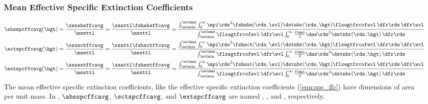 \documentclass[12pt]{article}
\begin{document}
\subsubsection[Mean Effective Specific Extinction Coefficients]{Mean Effective Specific Extinction Coefficients}\label{sxn:mac_ffc_avg}
\begin{subequations}
\label{eqn:spc_ffc_avg}
\begin{align}
\label{eqn:abs_spc_ffc_avg}
\absspcffcavg(\hgt) & = \frac{\xsxabsffcavg}{\mssttl} = 
\frac{\xsattl \fshabsffcavg}{\mssttl} =
\frac{\int_{\wvlmin}^{\wvlmax} \int_{0}^{\infty}
\mpi \rds^{2} \fshabs(\rds,\wvl) \dstnbr(\rds,\hgt) \flxwgtfrcofwvl \,\dfr\rds \,\dfr\wvl}
{\int_{\wvlmin}^{\wvlmax} \flxwgtfrcofwvl \,\dfr\wvl \int_{0}^{\infty}
\frac{4\mpi}{3} \dns \rds^{3} \dstnbr(\rds,\hgt) \,\dfr\rds} \\
\label{eqn:sct_spc_ffc_avg}
\sctspcffcavg(\hgt) & = \frac{\xsxsctffcavg}{\mssttl} = 
\frac{\xsattl \fshsctffcavg}{\mssttl} =
\frac{\int_{\wvlmin}^{\wvlmax} \int_{0}^{\infty}
\mpi \rds^{2} \fshsct(\rds,\wvl) \dstnbr(\rds,\hgt) \flxwgtfrcofwvl \,\dfr\rds \,\dfr\wvl}
{\int_{\wvlmin}^{\wvlmax} \flxwgtfrcofwvl \,\dfr\wvl \int_{0}^{\infty}
\frac{4\mpi}{3} \dns \rds^{3} \dstnbr(\rds,\hgt) \,\dfr\rds} \\
\label{eqn:ext_spc_ffc_avg}
\extspcffcavg(\hgt) & = \frac{\xsxextffcavg}{\mssttl} = 
\frac{\xsattl \fshextffcavg}{\mssttl} =
\frac{\int_{\wvlmin}^{\wvlmax} \int_{0}^{\infty}
\mpi \rds^{2} \fshext(\rds,\wvl) \dstnbr(\rds,\hgt) \flxwgtfrcofwvl \,\dfr\rds \,\dfr\wvl}
{\int_{\wvlmin}^{\wvlmax} \flxwgtfrcofwvl \,\dfr\wvl \int_{0}^{\infty}
\frac{4\mpi}{3} \dns \rds^{3} \dstnbr(\rds,\hgt) \,\dfr\rds}
\end{align}
\end{subequations}
The mean effective specific extinction coefficients, like the
effective specific extinction coefficients (\ref{eqn:spc_ffc}) have
dimensions of area per unit mass.
In , $\absspcffcavg$, $\sctspcffcavg$, and
$\extspcffcavg$ are named ,
, and , respectively. 
\end{document}
